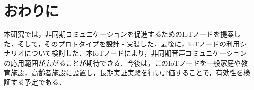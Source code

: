 \documentclass[submit,techrep,noauthor]{ipsj}
\begin{document}
\section{おわりに}
本研究では，非同期コミュニケーションを促進するためのIoTノードを提案した．そして，そのプロトタイプを設計・実装した．最後に，IoTノードの利用シナリオについて検討した．本IoTノードにより，非同期音声コミュニケーションの応用範囲が広がることが期待できる．今後は，このIoTノードを一般家庭や教育施設，高齢者施設に設置し，長期実証実験を行い評価することで，有効性を検証する予定である．



 
\end{document}
